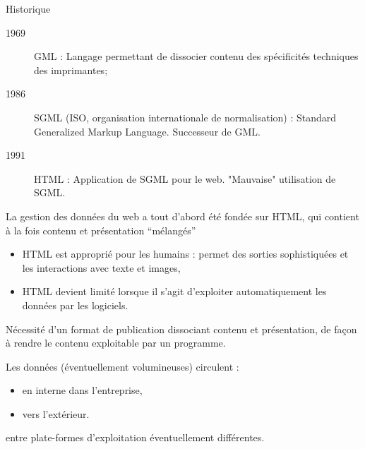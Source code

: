 \begin{frame}[allowframebreaks]{Historique}

\begin{description}
\item[1969]  GML : Langage permettant de dissocier contenu des sp\'ecificit\'es techniques des imprimantes;
\item[1986] SGML (ISO, organisation internationale de normalisation) : Standard Generalized Markup Language. Successeur de GML. 
\item[1991] HTML : Application de SGML pour le web. "Mauvaise" utilisation de SGML.
\end{description}


\framebreak

La gestion des donn\'ees du web a tout d'abord \'et\'e fond\'ee sur HTML, qui contient \`a la fois contenu et pr\'esentation ``m\'elang\'es''
\begin{itemize}
\item HTML est appropri\'e pour les humains : permet des sorties sophistiqu\'ees et les interactions avec texte et images,
\item HTML devient limit\'e lorsque il s'agit d'exploiter automatiquement les donn\'ees par les logiciels. 
\end{itemize}

\begin{block}{}
N\'ecessit\'e d'un format de publication dissociant contenu et pr\'esentation, de fa\c{c}on \`a rendre le contenu exploitable par un programme.
\end{block}

\framebreak

Les donn\'ees (\'eventuellement volumineuses) circulent :
\begin{itemize}
\item en interne dans l'entreprise,
\item vers l'ext\'erieur.
\end{itemize}
entre plate-formes d'exploitation \'eventuellement diff\'erentes.


\end{frame}
